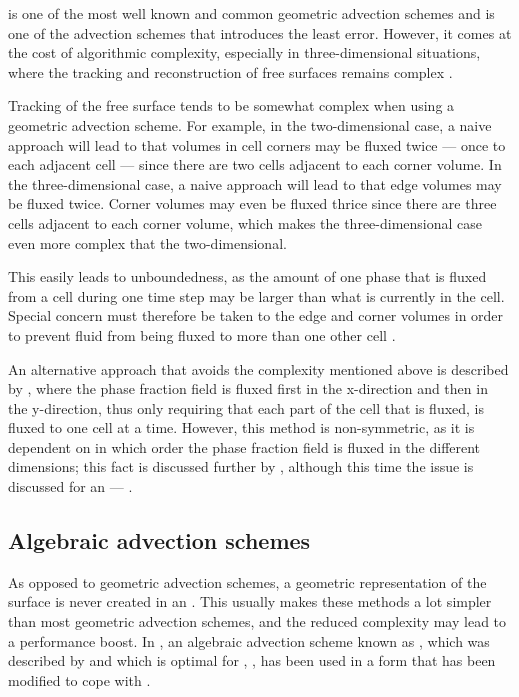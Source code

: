 \PLIC is one of the most well known and common geometric advection schemes and is one of the advection schemes that introduces the least error. However, it comes at the cost of algorithmic complexity, especially in three-dimensional situations, where the tracking and reconstruction of free surfaces remains complex \citep{Ingram2009}.

Tracking of the free surface tends to be somewhat complex when using a geometric advection scheme. For example, in the two-dimensional case, a naive approach will lead to that volumes in cell corners may be fluxed twice --- once to each adjacent cell --- since there are two cells adjacent to each corner volume. In the three-dimensional case, a naive approach will lead to that edge volumes may be fluxed twice. Corner volumes may even be fluxed thrice since there are three cells adjacent to each corner volume, which makes the three-dimensional case even more complex that the two-dimensional.

This easily leads to unboundedness, as the amount of one phase that is fluxed from a cell during one time step may be larger than what is currently in the cell. Special concern must therefore be taken to the edge and corner volumes in order to prevent fluid from being fluxed to more than one other cell \citep{Rider1997}.

An alternative approach that avoids the complexity mentioned above is described by \citet{Aulisa2003}, where the phase fraction field is fluxed first in the x-direction and then in the y-direction, thus only requiring that each part of the cell that is fluxed, is fluxed to one cell at a time. However, this method is non-symmetric, as it is dependent on in which order the phase fraction field is fluxed in the different dimensions; this fact is discussed further by \citet{Ubbink1999}, although this time the issue is discussed for an  --- \CICSAM.

\subsection{Algebraic advection schemes}

As opposed to geometric advection schemes, a geometric representation of the surface is never created in an . This usually makes these methods a lot simpler than most geometric advection schemes, and the reduced complexity may lead to a performance boost. In \thisprojectwork, an algebraic advection scheme known as , which was described by \citet{Leonard1988,Leonard1991} and which is optimal for , , has been used in a form that has been modified to cope with .

